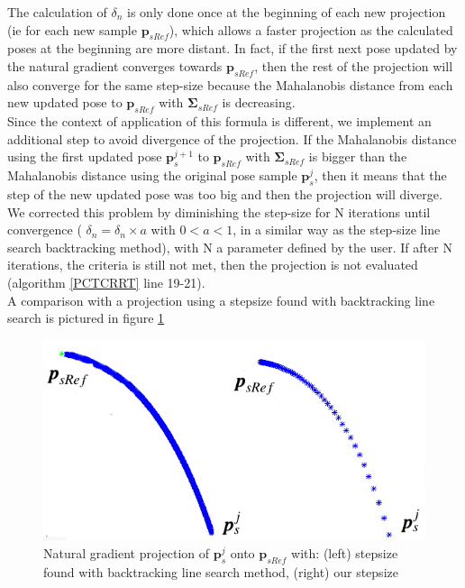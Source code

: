 \documentclass[letterpaper, 10 pt, conference]{ieeeconf}  %
\newcommand{\mb}[1]{{\boldsymbol{#1}}}
\begin{document}
The calculation of $\delta_{n}$ is only done once at the beginning of each new projection (ie for each new sample $\mb{p}_{sRef}$), which allows a faster projection as the calculated poses at the beginning are more distant. In fact, if the first next pose updated by the natural gradient converges towards $\mb{p}_{sRef}$, then the rest of the projection will also converge for the same step-size because the Mahalanobis distance from each new updated pose to  $\mb{p}_{sRef}$ with $\mb{\Sigma}_{sRef}$ is decreasing.\\
Since the context of application of this formula is different, we implement an additional step to avoid divergence of the projection. If the Mahalanobis distance using the first updated pose $\mb{p}_s^{j+1}$ to $\mb{p}_{sRef}$ with $\mb{\Sigma}_{sRef}$ is bigger than the Mahalanobis distance using the original pose sample $\mb{p}_s^{j}$, then it means that the step of the new updated pose was too big and then the projection will diverge. We corrected this problem by diminishing the step-size for N iterations until convergence ( $\delta_{n}= \delta_{n} \times a$ with $0<a<1$, in a similar way as the step-size line search backtracking method), with N a parameter defined by the user. If after N iterations, the criteria is still not met, then the projection is not evaluated (algorithm \ref{PCTCRRT} line 19-21).\\
A comparison with a projection using a stepsize found with backtracking line search is pictured in figure \ref{Stepsize}

\begin{figure}[h]
	\centering
	\includegraphics[scale=0.3]{figure/stepSizeComparison.png}
	\caption{Natural gradient projection of $\mb{p}_s^j$ onto $\mb{p}_{sRef}$ with: (left) stepsize found with backtracking line search method, (right) our stepsize}
	\label{Stepsize}
\end{figure}
\end{document}
